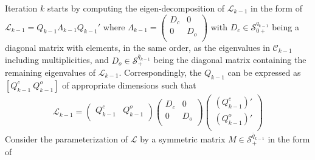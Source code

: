 \documentclass[onecolumn,reviewcopy]{autart}
\def \L{\mathcal{L}}
\def \S{\mathcal{S}}
\def \C{\mathcal{C}}
\begin{document}
Iteration $k$ starts by computing the eigen-decomposition of $\L_{k-1}$ in the form of $\L_{k-1}=Q_{k-1} \Lambda_{k-1} Q_{k-1}'$ where $\Lambda_{k-1}=\left(
                \begin{array}{cc}
                  D_c & 0 \\
                  0 & D_o \\
                \end{array}
              \right)$
with $D_c \in \S^{q_{k-1}}_{0+}$ being a diagonal matrix with elements, in the same order, as the eigenvalues in $\C_{k-1}$ including multiplicities,
and $D_o \in \S^{\bar{q}_{k-1}}_{+}$ being the diagonal matrix containing the remaining eigenvalues of $\L_{k-1}$.  Correspondingly, the $Q_{k-1}$ can be expressed as $[Q_{k-1}^c \: Q_{k-1}^o]$ of appropriate dimensions such that
\begin{align}\label{eqn:Lkminus1}
\L_{k-1}=\left(
           \begin{array}{cc}
             Q_{k-1}^c & Q_{k-1}^o \\
           \end{array}
         \right)\left(
                \begin{array}{cc}
                  D_c & 0 \\
                  0 & D_o \\
                \end{array}
              \right)\left(
                       \begin{array}{c}
                         (Q_{k-1}^c)' \\
                         (Q_{k-1}^o)' \\
                       \end{array}
                     \right)%
\end{align}
Consider the parameterization of $\L$ by a symmetric matrix $M \in \S^{\bar{q}_{k-1}}_{+}$ in the form of
\end{document}
